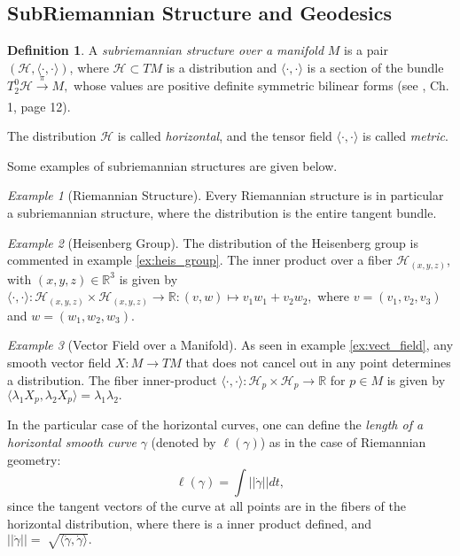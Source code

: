 \documentclass[12pt, letterpaper, reqno]{amsart}
\theoremstyle{definition}
\newtheorem{df}{Definition}
\theoremstyle{plain}
\theoremstyle{remark}
\newtheorem{ex}{Example}
\begin{document}
\subsection{SubRiemannian Structure and Geodesics}%
\label{sub:subriemannian_structure_and_geodesics}
\begin{df}
	A \textit{subriemannian structure over a manifold} $ M $ is a pair $ (\mathcal{H}, \langle\cdot,\cdot\rangle)$, where $ \mathcal{H}\subset TM $ is a distribution and $ \langle\cdot,\cdot\rangle $ is a section of the bundle $ T^0_2 \mathcal{H} \xrightarrow[]{\pi} M, $ whose values are positive definite symmetric bilinear forms (see \cite{hatcher2003vector}, Ch. 1, page 12).

	The distribution $ \mathcal{H} $ is called \textit{horizontal}, and the tensor field $ \langle\cdot,\cdot\rangle $ is called \textit{metric}.  
\end{df}

Some examples of subriemannian structures are given below.
\begin{ex}[Riemannian Structure]\label{ex:riem_geo2}
	Every Riemannian structure is in particular a subriemannian structure, where the distribution is the entire tangent bundle.
\end{ex}

\begin{ex}[Heisenberg Group]\label{ex:heis_group2}
	The distribution of the Heisenberg group is commented in example \ref{ex:heis_group}. The inner product over a fiber $ \mathcal{H}_{(x,y,z)} $, with $ (x,y,z)\in \mathbb{R}^3 $  is given by $\langle\cdot,\cdot\rangle:  \mathcal{H}_{(x,y,z)}\times\mathcal{H}_{(x,y,z)} \rightarrow { \mathbb{R} }:(v,w)\mapsto v_1w_1+v_2w_2,$ where $ v=(v_1,v_2,v_3) $ and $ w=(w_1,w_2,w_3). $  

\end{ex}
\begin{ex}[Vector Field over a Manifold]\label{ex:vect_field2}
	As seen in example \ref{ex:vect_field}, any smooth vector field $ X: M \rightarrow TM$ that does not cancel out in any point determines a distribution.  The fiber inner-product $ \langle\cdot,\cdot\rangle: \mathcal{H}_p \times \mathcal{H}_p \rightarrow \mathbb{R} $ for $ p\in M $  is given by $\langle\lambda_1 X_p,\lambda_2 X_p\rangle=\lambda_1 \lambda_2.$
\end{ex}
In the particular case of the horizontal curves, one can define the \textit{length of a horizontal smooth curve} $ \gamma $ (denoted by $ \ell(\gamma) $) as in the case of Riemannian geometry:
$$ \ell(\gamma) = \int ||\dot{\gamma}|| dt, $$ 
since the tangent vectors of the curve at all points are in the fibers of the horizontal distribution, where there is a inner product defined, and $ ||\dot{\gamma}||= \sqrt[]{\langle\dot{\gamma}, \dot{\gamma}\rangle}.  $   
\end{document}
